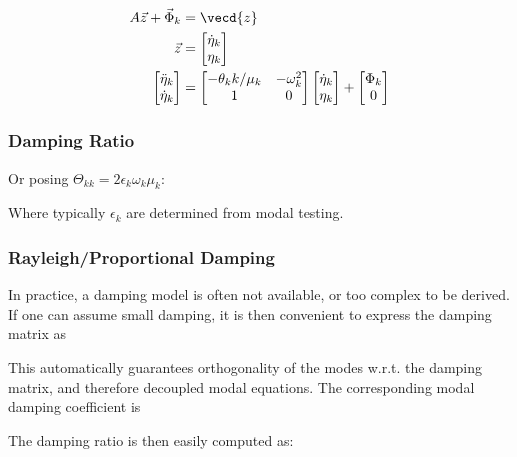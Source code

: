 \documentclass[10pt,a4paper]{scrartcl}
\begin{document}
\begin{multicols*}{2}
\begin{align*}
A\vec{z}+\vec{\Phi}_k&=\vecd{z}\\
\vec{z}&=\begin{bmatrix}
\dot{\eta}_k\\\eta_k
\end{bmatrix}\\
\begin{bmatrix}
\ddot{\eta}_k\\\dot{\eta}_k
\end{bmatrix}
&=\begin{bmatrix}
-\theta_kk/\mu_k&-\omega_k^2\\1&0
\end{bmatrix}\begin{bmatrix}
\dot{\eta}_k\\\eta_k
\end{bmatrix}+\begin{bmatrix}
\Phi_k\\0
\end{bmatrix}
\end{align*}

\subsubsection{Damping Ratio}

Or posing $\Theta_{kk}=2\epsilon_k\omega_k\mu_k$:


Where typically $\epsilon_k$ are determined from modal testing.

\subsubsection{Rayleigh/Proportional Damping}

In practice, a damping model is often not available, or too complex to be derived. If one can assume small damping, it is then convenient to express the damping matrix as


This automatically guarantees orthogonality of the modes w.r.t. the damping matrix, and therefore decoupled modal equations. The corresponding modal damping coefficient is


The damping ratio is then easily computed as:


\end{multicols*}
\end{document}
